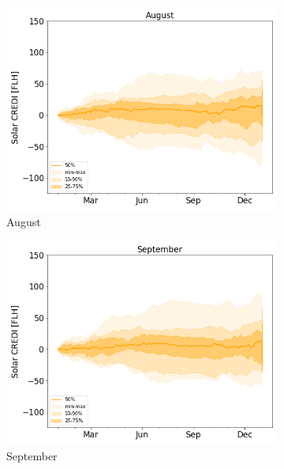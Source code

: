 \documentclass[a4paper,11pt]{extarticle}
\begin{document}
\begin{figure}[t]
\begin{subfigure}[t]{0.32\linewidth}
    \includegraphics[width=\linewidth]{Fig_CUMSUM_YearStart_SPV_August}
    \caption{August }
\end{subfigure}
\begin{subfigure}[t]{0.32\linewidth}
    \includegraphics[width=\linewidth]{Fig_CUMSUM_YearStart_SPV_September}
    \caption{September }
\end{subfigure}
\begin{subfigure}[t]{0.32\linewidth}

\end{subfigure}
\end{figure}
\end{document}
